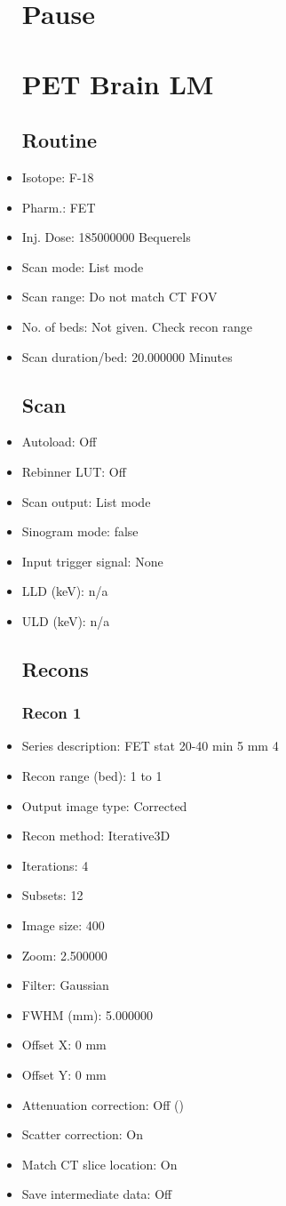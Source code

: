 \documentclass[12pt]{article}
\begin{document}
\begin{itemize}
\section{Pause}
\section{PET Brain LM}\subsection{Routine}
\item Isotope: F-18
\item Pharm.: FET
\item Inj. Dose: 185000000 Bequerels
\item Scan mode: List mode
\item Scan range: Do not match CT FOV
\item No. of beds: Not given. Check recon range
\item Scan duration/bed: 20.000000 Minutes
\subsection{Scan}
\item Autoload: Off
\item Rebinner LUT: Off
\item Scan output: List mode
\item Sinogram mode: false
\item Input trigger signal: None
\item LLD (keV): n/a
\item ULD (keV): n/a
\subsection{Recons}
\subsubsection{Recon 1}
\item Series description: FET stat 20-40 min 5 mm 4
\item Recon range (bed): 1 to 1
\item Output image type: Corrected
\item Recon method: Iterative3D
\item Iterations: 4
\item Subsets: 12
\item Image size: 400
\item Zoom: 2.500000
\item Filter: Gaussian
\item FWHM (mm): 5.000000
\item Offset X: 0 mm
\item Offset Y: 0 mm
\item Attenuation correction: Off ()
\item Scatter correction: On
\item Match CT slice location: On
\item Save intermediate data: Off

\end{itemize}
\end{document}
